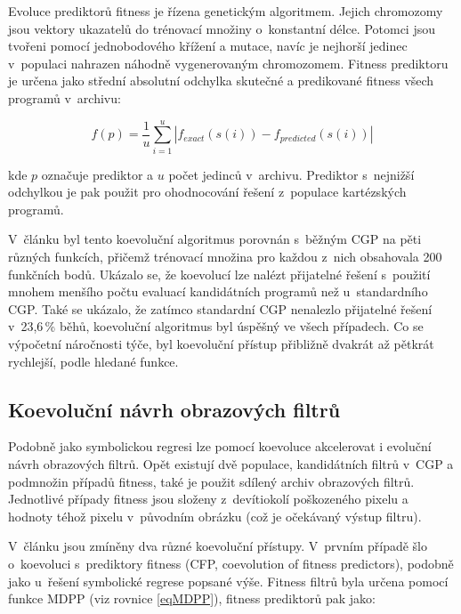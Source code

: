 Evoluce prediktorů fitness je řízena genetickým algoritmem. Jejich chromozomy jsou vektory ukazatelů do trénovací množiny o~konstantní délce. Potomci jsou tvořeni pomocí jednobodového křížení a mutace, navíc je nejhorší jedinec v~populaci nahrazen náhodně vygenerovaným chromozomem. Fitness prediktoru je určena jako střední absolutní odchylka skutečné a predikované fitness všech programů v~archivu:

\begin{equation}
    \label{eqFpredictorSR}
    f \left( p \right) = \frac{1}{u} \sum\limits_{i=1}^{u} \left| f_{\mathit{exact}} \left( s \left( i \right) \right) - f_{\mathit{predicted}} \left( s \left( i \right) \right) \right|
\end{equation}

\noindent{}kde $p$ označuje prediktor a $u$ počet jedinců v~archivu. Prediktor s~nejnižší odchylkou je pak použit pro ohodnocování řešení z~populace kartézských programů.

V~článku \cite{SikuEuroGP} byl tento koevoluční algoritmus porovnán s~běžným CGP na pěti různých funkcích, přičemž trénovací množina pro každou z~nich obsahovala 200 funkčních bodů. Ukázalo se, že koevolucí lze nalézt přijatelné řešení s~použití mnohem menšího počtu evaluací kandidátních programů než u~standardního CGP. Také se ukázalo, že zatímco standardní CGP nenalezlo přijatelné řešení v~23,6\,\% běhů, koevoluční algoritmus byl úspěšný ve všech případech. Co se výpočetní náročnosti týče, byl koevoluční přístup přibližně dvakrát až pětkrát rychlejší, podle hledané funkce.


\subsection{Koevoluční návrh obrazových filtrů}
\label{secCoevIF}

Podobně jako symbolickou regresi lze pomocí koevoluce akcelerovat i evoluční návrh obrazových filtrů. Opět existují dvě populace, kandidátních filtrů v~CGP a podmnožin případů fitness, také je použit sdílený archiv obrazových filtrů. Jednotlivé případy fitness jsou složeny z~devítiokolí poškozeného pixelu a hodnoty téhož pixelu v~původním obrázku (což je očekávaný výstup filtru).

V~článku \cite{SikuPPSN} jsou zmíněny dva různé koevoluční přístupy. V~prvním případě šlo o~koevoluci s~prediktory fitness (CFP, coevolution of fitness predictors), podobně jako u~řešení symbolické regrese popsané výše. Fitness filtrů byla určena pomocí funkce MDPP (viz rovnice \ref{eqMDPP}), fitness prediktorů pak jako:

